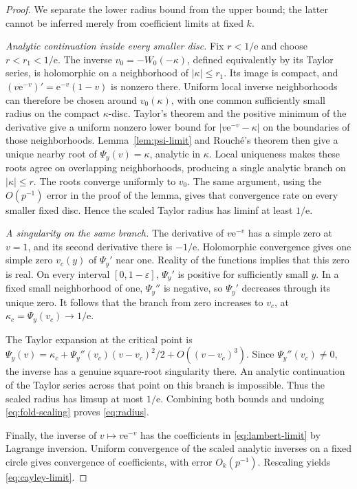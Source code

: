 \documentclass[11pt,a4paper]{article}
\numberwithin{equation}{section}
\theoremstyle{definition}
\theoremstyle{remark}
\newcommand{\ee}{\mathrm e}
\begin{document}
\begin{proof}
We separate the lower radius bound from the upper bound; the latter
cannot be inferred merely from coefficient limits at fixed \(k\).

\emph{Analytic continuation inside every smaller disc.}
Fix \(r<1/\ee\) and choose \(r<r_1<1/\ee\). The inverse
\(v_0=-W_0(-\kappa)\), defined equivalently by its Taylor series, is
holomorphic on a neighborhood of \(|\kappa|\le r_1\). Its image is
compact, and \((v\ee^{-v})'=\ee^{-v}(1-v)\) is nonzero there.
Uniform local inverse neighborhoods can therefore be chosen around
\(v_0(\kappa)\), with one common sufficiently small radius on the
compact \(\kappa\)-disc. Taylor's theorem and the positive minimum of
the derivative give a uniform nonzero lower bound for
\(|v\ee^{-v}-\kappa|\) on the boundaries of those neighborhoods.
Lemma~\ref{lem:psi-limit} and Rouch\'e's theorem then give a unique nearby
root of \(\Psi_y(v)=\kappa\), analytic in \(\kappa\). Local uniqueness
makes these roots agree on overlapping neighborhoods, producing a
single analytic branch on \(|\kappa|\le r\).
The roots converge uniformly to \(v_0\). The same argument, using the
\(O(p^{-1})\) error in the proof of the lemma, gives that convergence
rate on every smaller fixed disc. Hence the scaled Taylor radius has
liminf at least \(1/\ee\).

\emph{A singularity on the same branch.}
The derivative of \(v\ee^{-v}\) has a simple zero at \(v=1\), and its
second derivative there is \(-1/\ee\). Holomorphic convergence gives
one simple zero \(v_c(y)\) of \(\Psi_y'\) near one. Reality of the
functions implies that this zero is real. On every interval
\([0,1-\varepsilon]\), \(\Psi_y'\) is positive for sufficiently small
\(y\). In a fixed small neighborhood of one, \(\Psi_y''\) is negative,
so \(\Psi_y'\) decreases through its unique zero. It follows that the
branch from zero increases to \(v_c\), at
\(\kappa_c=\Psi_y(v_c)\to1/\ee\).

The Taylor expansion at the critical point is
\(\Psi_y(v)=\kappa_c+\Psi_y''(v_c)(v-v_c)^2/2+O((v-v_c)^3)\).
Since \(\Psi_y''(v_c)\ne0\), the inverse has a genuine square-root
singularity there. An analytic continuation of the Taylor series across
that point on this branch is impossible. Thus the scaled radius has
limsup at most \(1/\ee\). Combining both bounds and undoing
\eqref{eq:fold-scaling} proves \eqref{eq:radius}.

Finally, the inverse of \(v\mapsto v\ee^{-v}\) has the coefficients in
\eqref{eq:lambert-limit} by Lagrange inversion. Uniform convergence of
the scaled analytic inverses on a fixed circle gives convergence of
coefficients, with error \(O_k(p^{-1})\). Rescaling yields
\eqref{eq:cayley-limit}.
\end{proof}
\end{document}
